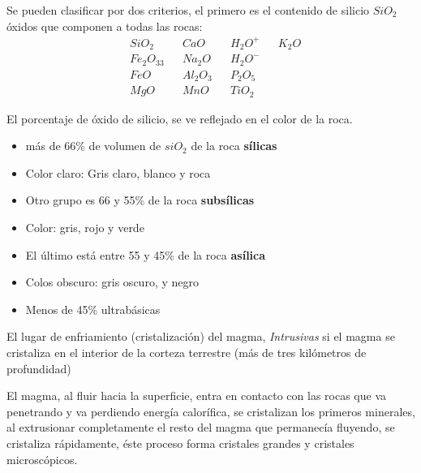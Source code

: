 Se pueden clasificar por dos criterios, el primero es el contenido de silicio $SiO_2$
óxidos que componen a todas las rocas:
\begin{align*}
    &SiO_2&&CaO&&H_2O^+&&K_2O\\
    &Fe_2O_33&&Na_2O&&H_2O^-\\
    &FeO&&Al_2O_3&&P_2O_5\\
    &MgO&&MnO&&TiO_2
\end{align*}

El porcentaje de óxido de silicio, se ve reflejado en el color de la roca.

\begin{itemize}
    \item más de 66\% de volumen de $siO_2$ de la roca \textbf{sílicas}
    \item Color claro: Gris claro, blanco y roca
    \item Otro grupo es 66 y 55\% de la roca \textbf{subsílicas}
    \item Color: gris, rojo y verde
    \item El último está entre 55 y 45\% de la roca \textbf{asílica}
    \item Colos obscuro: gris oscuro, y negro
    \item Menos de 45\% ultrabásicas
\end{itemize}

El lugar de enfriamiento (cristalización) del magma, \textit{Intrusivas} si el magma se cristaliza en el interior de la corteza terrestre (más de tres kilómetros de profundidad)

\begin{definition}[Porfídicas]
    El magma, al fluir hacia la superficie, entra en contacto con las rocas que va penetrando y va perdiendo energía calorífica, se cristalizan los primeros minerales, al extrusionar completamente el resto del magma que permanecía fluyendo, se cristaliza rápidamente, éste proceso forma cristales grandes y cristales microscópicos.
\end{definition}

